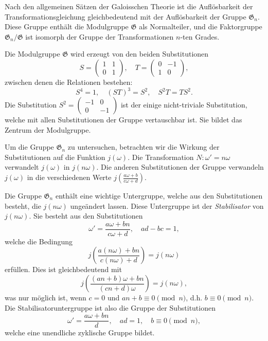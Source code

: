 \documentclass[12pt,a4paper]{article}
\theoremstyle{definition}
\begin{document}
Nach den allgemeinen S\"atzen der Galoisschen Theorie ist die
Aufl\"osbarkeit der Transformationsgleichung gleichbedeutend mit
der Aufl\"osbarkeit der Gruppe $\mathfrak{G}_n$. Diese Gruppe enth\"alt die
Modulgruppe $\mathfrak{G}$ als Normalteiler, und die Faktorgruppe
$\mathfrak{G}_n/\mathfrak{G}$ ist isomorph der Gruppe der Transformationen $n$-ten
Grades.

Die Modulgruppe $\mathfrak{G}$ wird erzeugt von den beiden Substitutionen
\begin{equation}\tag{1}
S = \begin{pmatrix} 1 & 1 \\ 0 & 1 \end{pmatrix}, \quad T = \begin{pmatrix} 0 & -1 \\ 1 & 0 \end{pmatrix},
\end{equation}
zwischen denen die Relationen bestehen:
\begin{equation}\tag{2}
S^4 = 1, \quad (ST)^3 = S^2, \quad S^2T = TS^2.
\end{equation}
Die Substitution $S^2 = \begin{pmatrix} -1 & 0 \\ 0 & -1 \end{pmatrix}$ ist der
einige nicht-triviale Substitution, welche mit allen Substitutionen
der Gruppe vertauschbar ist. Sie bildet das Zentrum der Modulgruppe.

Um die Gruppe $\mathfrak{G}_n$ zu untersuchen, betrachten wir die
Wirkung der Substitutionen auf die Funktion $j(\omega)$. Die
Transformation $N: \omega' = n\omega$ verwandelt $j(\omega)$ in
$j(n\omega)$. Die anderen Substitutionen der Gruppe verwandeln
$j(\omega)$ in die verschiedenen Werte $j\left(\frac{a\omega+b}{c\omega+d}\right)$.

Die Gruppe $\mathfrak{G}_n$ enth\"alt eine wichtige Untergruppe,
welche aus den Substitutionen besteht, die $j(n\omega)$ unge\"andert
lassen. Diese Untergruppe ist der \textit{Stabilisator} von $j(n\omega)$.
Sie besteht aus den Substitutionen
\begin{equation}\tag{3}
\omega' = \frac{a\omega + bn}{c\omega + d}, \quad ad - bc = 1,
\end{equation}
welche die Bedingung
\begin{equation}\tag{4}
j\left(\frac{a(n\omega)+bn}{c(n\omega)+d}\right) = j(n\omega)
\end{equation}
erf\"ullen. Dies ist gleichbedeutend mit
\begin{equation*}
j\left(\frac{(an+b)\omega + bn}{(cn+d)\omega}\right) = j(n\omega),
\end{equation*}
was nur m\"oglich ist, wenn $c = 0$ und $an + b \equiv 0 \pmod{n}$,
d.h. $b \equiv 0 \pmod{n}$.
Die Stabilisatoruntergruppe ist also die Gruppe der Substitutionen
\begin{equation}\tag{5}
\omega' = \frac{a\omega + bn}{d}, \quad ad = 1, \quad b \equiv 0 \pmod{n},
\end{equation}
welche eine unendliche zyklische Gruppe bildet.
\end{document}
